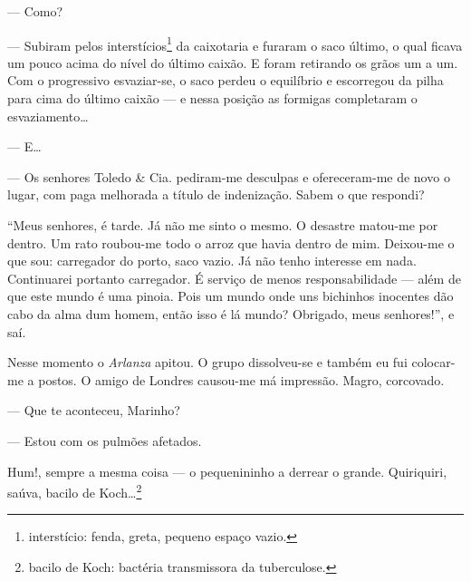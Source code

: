 --- Como?

--- Subiram pelos interstícios\footnote{interstício: fenda, greta,
  pequeno espaço vazio.} da caixotaria e furaram o saco último, o qual
ficava um pouco acima do nível do último caixão. E foram retirando os
grãos um a um. Com o progressivo esvaziar-se, o saco perdeu o equilíbrio
e escorregou da pilha para cima do último caixão --- e nessa posição as
formigas completaram o esvaziamento\ldots{}

--- E\ldots{}

--- Os senhores Toledo \& Cia. pediram-me desculpas e ofereceram-me de
novo o lugar, com paga melhorada a título de indenização. Sabem o que
respondi?

``Meus senhores, é tarde. Já não me sinto o mesmo. O desastre matou-me
por dentro. Um rato roubou-me todo o arroz que havia dentro de mim.
Deixou-me o que sou: carregador do porto, saco vazio. Já não tenho
interesse em nada. Continuarei portanto carregador. É serviço de menos
responsabilidade --- além de que este mundo é uma pinoia. Pois um mundo
onde uns bichinhos inocentes dão cabo da alma dum homem, então isso é lá
mundo? Obrigado, meus senhores!'', e saí.

Nesse momento o \emph{Arlanza} apitou. O grupo dissolveu-se e também eu
fui colocar-me a postos. O amigo de Londres causou-me má impressão.
Magro, corcovado.

--- Que te aconteceu, Marinho?

--- Estou com os pulmões afetados.

Hum!, sempre a mesma coisa --- o pequenininho a derrear o grande.
Quiriquiri, saúva, bacilo de Koch\ldots{}\footnote{bacilo de Koch:
  bactéria transmissora da tuberculose.}

\blankpage

